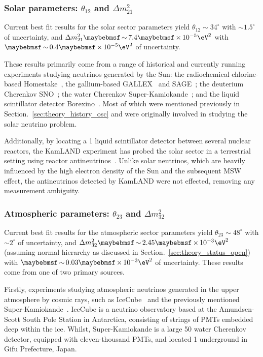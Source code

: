 \subsubsection*{Solar parameters: $\theta_{12}$ and $\Delta m^{2}_{21}$} %

Current best fit results for the solar sector parameters yield $\theta_{12}\sim34^{\circ}$ with
$\sim1.5^{\circ}$ of uncertainty, and $\Delta m^{2}_{21}\sim7.4\times10^{-5}\eV^{2}$ with
$\sim0.4\times10^{-5}\eV^{2}$ of uncertainty.

These results primarily come from a range of historical and currently running experiments studying
neutrinos generated by the Sun: the radiochemical chlorine-based Homestake~\cite{cleveland1998},
the gallium-based GALLEX~\cite{kaether2010} and SAGE~\cite{abdurashitov2009}; the deuterium
Cherenkov SNO~\cite{maneira2011}; the water Cherenkov Super-Kamiokande~\cite{hosaka2006,
    cravens2008, abe2011_super, nakano2017}; and the liquid scintillator detector
Borexino~\cite{bellini2011, bellini2010, bellini2014}. Most of which were mentioned previously in
Section.~\ref{sec:theory_history_osc} and were originally involved in studying the solar neutrino
problem.

Additionally, by locating a \unit{1}{} liquid scintillator detector between several
nuclear reactors, the KamLAND experiment has probed the solar sector in a terrestrial setting
using reactor antineutrinos~\cite{gando2011}. Unlike solar neutrinos, which are heavily influenced
by the high electron density of the Sun and the subsequent MSW effect, the antineutrinos detected
by KamLAND were not effected, removing any measurement ambiguity.

\subsubsection*{Atmospheric parameters: $\theta_{23}$ and $\Delta m^{2}_{32}$} %

Current best fit results for the atmospheric sector parameters yield $\theta_{23}\sim48^{\circ}$
with $\sim2^{\circ}$ of uncertainty, and $\Delta m^{2}_{32}\sim2.45\times10^{-3}\eV^{2}$ (assuming
normal hierarchy as discussed in Section.~\ref{sec:theory_status_open}) with
$\sim0.03\times10^{-3}\eV^{2}$ of uncertainty. These results come from one of two primary sources.

Firstly, experiments studying atmospheric neutrinos generated in the upper atmosphere by cosmic
rays, such as IceCube~\cite{karle2003, aartsen2015} and the previously mentioned
Super-Kamiokande~\cite{abe2018}. IceCube is a neutrino observatory based at the Amundsen-Scott
South Pole Station in Antarctica, consisting of strings of PMTs embedded deep within the ice.
Whilst, Super-Kamiokande is a large \unit{50}{} water Cherenkov detector, equipped with
eleven-thousand PMTs, and located \unit{1}{} underground in Gifu Prefecture, Japan.


